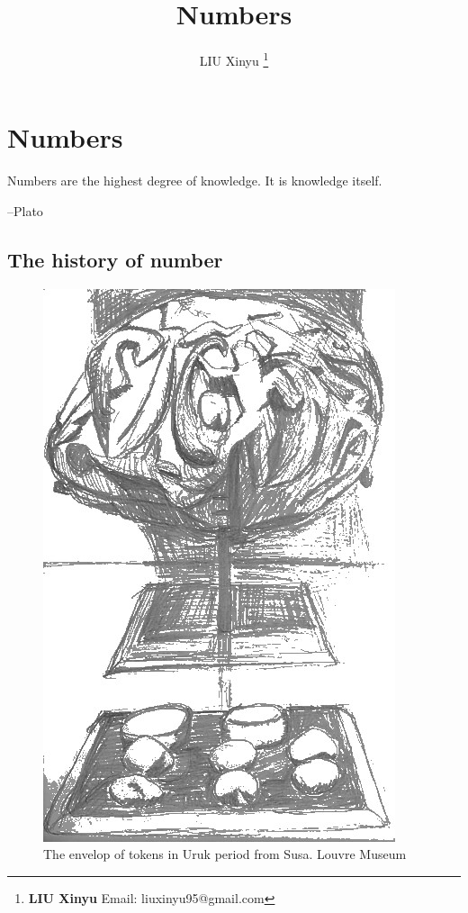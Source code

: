 \documentclass[UTF8]{article}
\begin{document}
\title{Numbers}

\author{LIU Xinyu
\thanks{{\bfseries LIU Xinyu} \newline
  Email: liuxinyu95@gmail.com \newline}
  }

\maketitle
\fi


\ifx\wholebook\relax
\chapter{Numbers}
\fi

\epigraph{Numbers are the highest degree of knowledge. It is knowledge itself.}{--Plato}

\section{The history of number}

\begin{figure}
 \centering
 \includegraphics[scale=0.38]{img/clay-envelope.jpg}
 \caption{The envelop of tokens in Uruk period from Susa. Louvre Museum}
 \label{fig:clay-token}
\end{figure}
\end{document}
